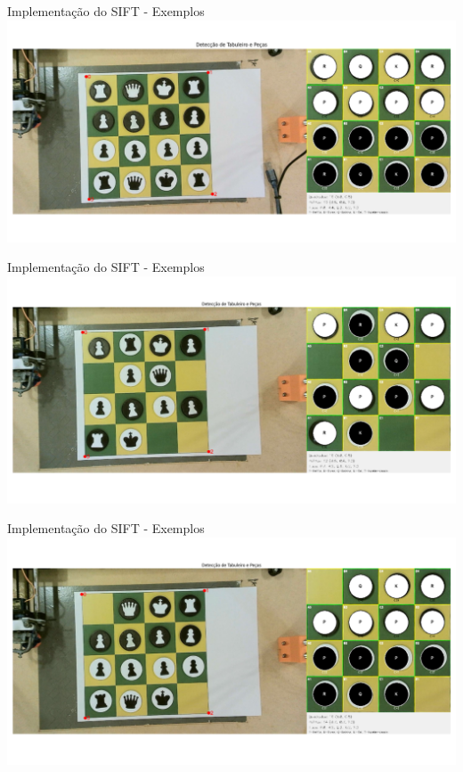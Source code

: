 \documentclass{beamer}
\begin{document}
\begin{frame}[plain]{Implementação do SIFT - Exemplos}
  \centering
\includegraphics[width=0.95\paperwidth,keepaspectratio]{images/exemplo3_cv.png}
\end{frame}

\begin{frame}[plain]{Implementação do SIFT - Exemplos}
  \centering
\includegraphics[width=0.95\paperwidth,keepaspectratio]{images/exemplo1_cv.png}
\end{frame}

\begin{frame}[plain]{Implementação do SIFT - Exemplos}
  \centering
\includegraphics[width=0.95\paperwidth,keepaspectratio]{images/exemplo2_cv.png}
\end{frame}
\end{document}
